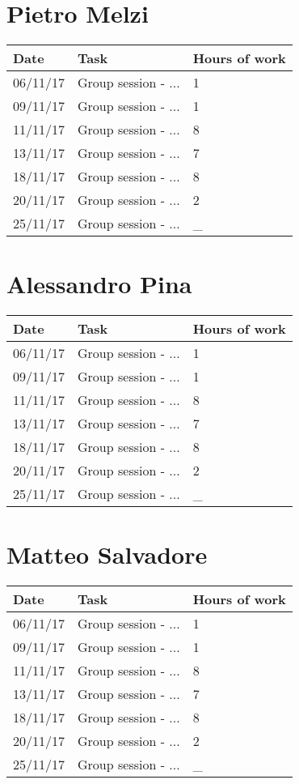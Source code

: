 \section{Pietro Melzi}
\begin{table}[H]
	\begin{tabular}{ p{2cm} p{8cm} p{3cm}}
	Date & Task & Hours of work\\
	\hline
	06/11/17 & Group session - ... & 1 \\
	09/11/17 & Group session - ... & 1 \\
	11/11/17 & Group session - ... & 8 \\
	13/11/17 & Group session - ... & 7 \\
	18/11/17 & Group session - ... & 8 \\
	20/11/17 & Group session - ... & 2 \\
	25/11/17 & Group session - ... & _ \\
	\end{tabular}
\end{table}

\section{Alessandro Pina}
\begin{table}[H]
	\begin{tabular}{ p{2cm} p{8cm} p{3cm}}
	Date & Task & Hours of work\\
	\hline
	06/11/17 & Group session - ... & 1 \\
	09/11/17 & Group session - ... & 1 \\
	11/11/17 & Group session - ... & 8 \\
	13/11/17 & Group session - ... & 7 \\
	18/11/17 & Group session - ... & 8 \\
	20/11/17 & Group session - ... & 2 \\
	25/11/17 & Group session - ... & _ \\
	\end{tabular}
\end{table}

\section{Matteo Salvadore}
\begin{table}[H]
	\begin{tabular}{ p{2cm} p{8cm} p{3cm}}
	Date & Task & Hours of work\\
	\hline
	06/11/17 & Group session - ... & 1 \\
	09/11/17 & Group session - ... & 1 \\
	11/11/17 & Group session - ... & 8 \\
	13/11/17 & Group session - ... & 7 \\
	18/11/17 & Group session - ... & 8 \\
	20/11/17 & Group session - ... & 2 \\
	25/11/17 & Group session - ... & _ \\
	\end{tabular}
\end{table}